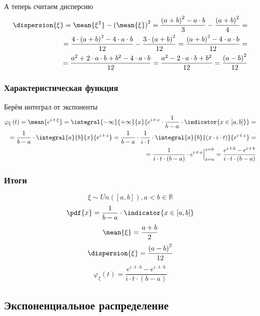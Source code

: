 А теперь считаем дисперсию
\begin{align*}
    \dispersion{\xi}
        = \mean{\xi^2} - \left( \mean{\xi} \right)^2
        = \frac{\left( a + b \right)^2 - a \cdot b}{3}
            - \frac{\left( a + b \right)^2}{4} = \\
        = \frac{4 \cdot \left( a + b \right)^2 - 4 \cdot a \cdot b}{12}
            - \frac{3 \cdot \left( a + b \right)^2}{12}
        = \frac{\left( a + b \right)^2 - 4 \cdot a \cdot b}{12} = \\
        = \frac{a^2 + 2 \cdot a \cdot b + b^2 - 4 \cdot a \cdot b}{12}
        = \frac{a^2 - 2 \cdot a \cdot b + b^2}{12}
        = \frac{\left( a-b \right)^2}{12}
\end{align*}
\subsubsection{Характеристическая функция}
Берём интеграл от экспоненты
\begin{align*}
    \varphi_{\xi}\left( t \right) = \mean{e^{i \cdot t \cdot \xi}}
        = \integral{-\infty}{+\infty}{x}{
            e^{i \cdot t \cdot x} \cdot \frac{1}{b-a}
                \cdot \indicator{x \in [a,b]}} = \\
        = \frac{1}{b-a} \cdot \integral{a}{b}{x}{e^{i \cdot t \cdot x}}
        = \frac{1}{b-a} \cdot \frac{1}{i \cdot t}
            \cdot \integral{a}{b}{\left( x \cdot i \cdot t \right)}
                {e^{i \cdot t \cdot x}} = \\
        = \frac{1}{i \cdot t \cdot \left( b - a \right)}
            \cdot \Bigl. e^{i \cdot t \cdot x} \Bigr|_{x=a}^{x=b}
        = \frac{e^{i \cdot t \cdot b} - e^{i \cdot t \cdot b}}
            {i \cdot t \cdot \left( b - a \right)}
\end{align*}
\subsubsection{Итоги}
$$\xi \sim Un\left( \left[ a,b \right] \right), a<b \in \mathbb{R}$$
$$\pdf{x}
    = \frac{1}{b-a} \cdot \indicator{x \in [a,b]}$$
$$\mean{\xi} = \frac{a+b}{2}$$
$$\dispersion{\xi} = \frac{\left( a-b \right)^2}{12}$$
$$\varphi_{\xi}\left( t \right) =
    \frac{e^{i \cdot t \cdot b} - e^{i \cdot t \cdot b}}
        {i \cdot t \cdot \left( b - a \right)}$$

\subsection{Экспоненциальное распределение}
